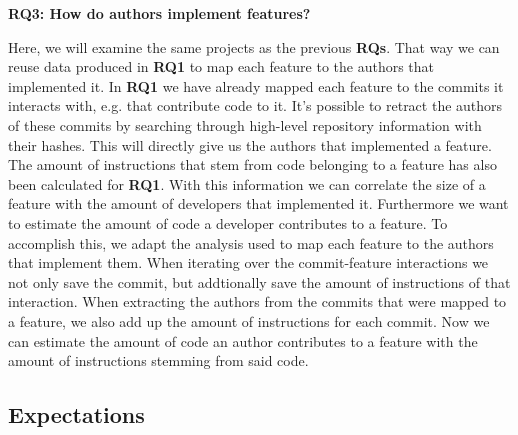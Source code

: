 \textbf{RQ3: How do authors implement features?}

Here, we will examine the same projects as the previous \textbf{RQs}.
That way we can reuse data produced in \textbf{RQ1} to map each feature to the authors that implemented it.
In \textbf{RQ1} we have already mapped each feature to the commits it interacts with, e.g. that contribute code to it.
It's possible to retract the authors of these commits by searching through high-level repository information with their hashes.
This will directly give us the authors that implemented a feature.
The amount of instructions that stem from code belonging to a feature has also been calculated for \textbf{RQ1}.
With this information we can correlate the size of a feature with the amount of developers that implemented it.
Furthermore we want to estimate the amount of code a developer contributes to a feature.
To accomplish this, we adapt the analysis used to map each feature to the authors that implement them.
When iterating over the commit-feature interactions we not only save the commit, but addtionally save the amount of instructions of that interaction.
When extracting the authors from the commits that were mapped to a feature, we also add up the amount of instructions for each commit.
Now we can estimate the amount of code an author contributes to a feature with the amount of instructions stemming from said code.

\subsection*{Expectations}\label{sec:expectations}

